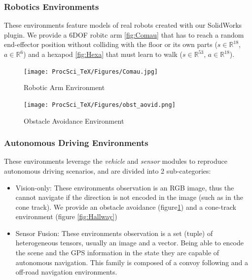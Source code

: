 \documentclass{svproc}
\begin{document}
\subsubsection{Robotics Environments}
These environments feature models of real robots created with our SolidWorks plugin. We provide a 6DOF robitc arm \ref{fig:Comau} that has to reach a random end-effector position without colliding with the floor or its own parts ($s \in \mathbb{R}^{18}$, $a \in \mathbb{R}^6$) and a hexapod \ref{fig:Hexa} that must learn to walk ($s \in \mathbb{R}^{53}$, $a \in \mathbb{R}^{18}$).

\begin{figure}[ht]
 \begin{minipage}[b]{0.6\linewidth}
    \centering
    \texttt{[image: ProcSci\_TeX/Figures/Comau.jpg]}
    \caption{Robotic Arm Environment}
    \label{fig:Comau}
 \end{minipage}
 \begin{minipage}[b]{0.6\linewidth}
    \centering
    \texttt{[image: ProcSci\_TeX/Figures/obst\_aovid.png]}
    \caption{Obstacle Avoidance Environment}
    \label{fig:Obst_avoid}
 \end{minipage}
\end{figure}

\subsubsection{Autonomous Driving Environments}
These environments leverage the \textit{vehicle} and \textit{sensor} modules to reproduce autonomous driving scenarios, and are divided into 2 sub-categories:
\begin{itemize}
    \item Vision-only: \newline
    These environments observation is an RGB image, thus the cannot navigate if the direction is not encoded in the image (such as in the cone track). We provide an obstacle avoidance (figure\ref{fig:Obst_avoid}) and a cone-track environment (figure \ref{fig:Hallway})
    \item Sensor Fusion: \newline
    These environments observation is a set (tuple) of heterogeneous tensors, usually an image and a vector. Being able to encode the scene and the GPS information in the state they are capable of autonomous navigation. This family is composed of a convoy following and a off-road navigation environments.
\end{itemize}
\end{document}
